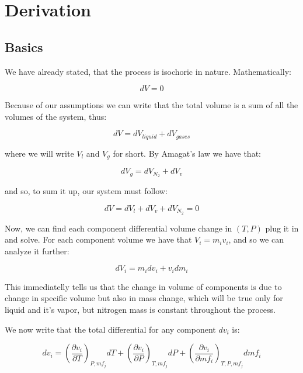 \documentclass[10pt, letterpaper]{article}
\begin{document}
	\section{Derivation}
	\subsection{Basics}
	\label{sec:basics}

	We have already stated, that the process is isochoric in nature. Mathematically:

	\begin{equation*}
		dV = 0
	\end{equation*}
	
	Because of our assumptions we can write that the total volume is a sum of all the volumes of the system, thus:

	\begin{equation*}
		dV = dV_{liquid} + dV_{gases}
	\end{equation*}

	where we will write $V_{l}$ and $V_{g}$ for short. By Amagat's law we have that:

	\begin{equation*}
		dV_{g} = dV_{N_{2}} + dV_{v}
	\end{equation*}

	and so, to sum it up, our system must follow:

	\begin{equation*}
		dV = dV_{l} + dV_{v} + dV_{N_{2}} = 0
	\end{equation*}

	Now, we can find each component differential volume change in $(T, P)$ plug it in and solve. For each component volume we have that $V_{i} = m_{i} v_{i}$, and so we can analyze it further:

	\begin{equation*}
		dV_{i} = m_{i} dv_{i} + v_{i} dm_{i}
	\end{equation*}

	This immediatelly tells us that the change in volume of components is due to change in specific volume but also in mass change, which will be true only for liquid and it's vapor, but nitrogen mass is constant throughout the process.

	We now write that the total differential for any component $dv_{i}$ is:

	\begin{equation*}
		dv_{i} = \left( \frac{\partial{v_{i}}}{\partial{T}} \right)_{P, mf_{j}} dT +
		\left( \frac{\partial{v_{i}}}{\partial{P}} \right)_{T, mf_{j}} dP +
		\left( \frac{\partial{v_{i}}}{\partial{mf_{i}}} \right)_{T, P, mf_{j}} dmf_{i}
	\end{equation*}
\end{document}
